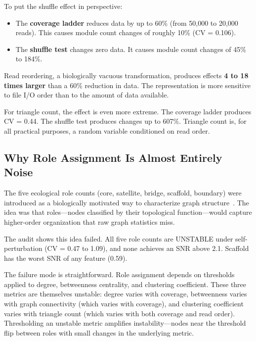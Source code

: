 \documentclass{../yalumba}
\begin{document}
To put the shuffle effect in perspective:

\begin{itemize}
  \item The \textbf{coverage ladder} reduces data by up to 60\% (from
    50,000 to 20,000 reads).  This causes module count changes of
    roughly 10\% (CV = 0.106).
  \item The \textbf{shuffle test} changes zero data.  It causes module
    count changes of 45\% to 184\%.
\end{itemize}

Read reordering, a biologically vacuous transformation, produces effects
\textbf{4 to 18 times larger} than a 60\% reduction in data.  The
representation is more sensitive to file I/O order than to the amount of
data available.

For triangle count, the effect is even more extreme.  The coverage
ladder produces CV = 0.44.  The shuffle test produces changes up to
607\%.  Triangle count is, for all practical purposes, a random variable
conditioned on read order.

\subsection{Why Role Assignment Is Almost Entirely Noise}
\label{sec:roles-noise}

The five ecological role counts (core, satellite, bridge, scaffold,
boundary) were introduced as a biologically motivated way to
characterize graph structure~\cite{hartwell1999cell}.  The idea was that
roles---nodes classified by their topological function---would capture
higher-order organization that raw graph statistics miss.

The audit shows this idea failed.  All five role counts are UNSTABLE
under self-perturbation (CV = 0.47 to 1.09), and none achieves an SNR
above 2.1.  Scaffold has the worst SNR of any feature (0.59).

The failure mode is straightforward.  Role assignment depends on
thresholds applied to degree, betweenness centrality, and clustering
coefficient.  These three metrics are themselves unstable: degree
varies with coverage, betweenness varies with graph connectivity
(which varies with coverage), and clustering coefficient varies with
triangle count (which varies with both coverage and read order).
Thresholding an unstable metric amplifies instability---nodes near the
threshold flip between roles with small changes in the underlying
metric.
\end{document}
